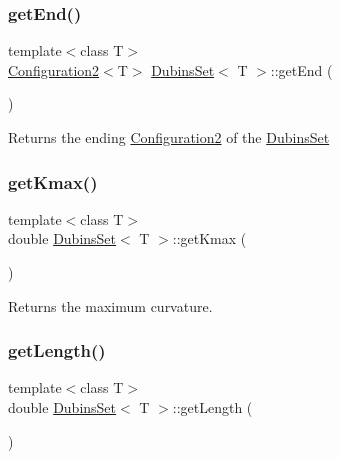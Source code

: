 \subsubsection{\texorpdfstring{getEnd()}{getEnd()}}
{\footnotesize\ttfamily template$<$class T$>$ \\
\mbox{\hyperlink{class_configuration2}{Configuration2}}$<$T$>$ \mbox{\hyperlink{class_dubins_set}{Dubins\+Set}}$<$ T $>$\+::get\+End (\begin{DoxyParamCaption}{ }\end{DoxyParamCaption})\hspace{0.3cm}{\ttfamily [inline]}}



Returns the ending {\ttfamily \mbox{\hyperlink{class_configuration2}{Configuration2}}} of the {\ttfamily \mbox{\hyperlink{class_dubins_set}{Dubins\+Set}}} 

\mbox{\label{class_dubins_set_af97fa42a6a9a6325c4d1ed4541758272}} 
\subsubsection{\texorpdfstring{getKmax()}{getKmax()}}
{\footnotesize\ttfamily template$<$class T$>$ \\
double \mbox{\hyperlink{class_dubins_set}{Dubins\+Set}}$<$ T $>$\+::get\+Kmax (\begin{DoxyParamCaption}{ }\end{DoxyParamCaption})\hspace{0.3cm}{\ttfamily [inline]}}



Returns the maximum curvature. 

\mbox{\label{class_dubins_set_ad491b5f7e71c3db5ffed11643d2d4e4c}} 
\subsubsection{\texorpdfstring{getLength()}{getLength()}}
{\footnotesize\ttfamily template$<$class T$>$ \\
double \mbox{\hyperlink{class_dubins_set}{Dubins\+Set}}$<$ T $>$\+::get\+Length (\begin{DoxyParamCaption}{ }\end{DoxyParamCaption})\hspace{0.3cm}{\ttfamily [inline]}}



